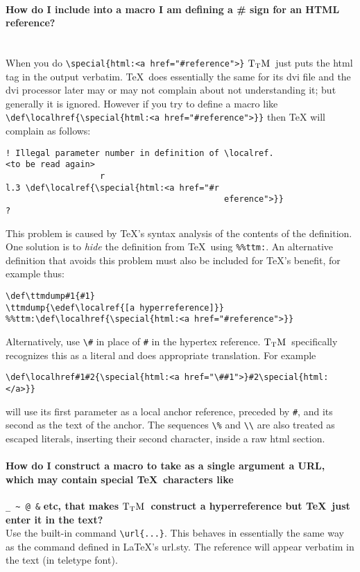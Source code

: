 \documentclass[12pt]{article}
\def\ttmdump{}
\def\TtM{$\rm{}T_TH$}
\def\TtM{$\rm{}T_TM$}%
\begin{document}
\paragraph{How do I include into a macro I am defining a \# sign
for an HTML reference?}\leavevmode\\
When you do \verb!\special{html:<a href="#reference">}! 
\TtM\ just puts the html tag in the output verbatim. \TeX\ does essentially the
same for its dvi file and the dvi processor later may or may not complain
about not understanding it; but generally it is ignored. However if you try
to define a macro like
\verb|\def\localhref{\special{html:<a href="#reference">}}| then \TeX
will complain as follows:\begin{verbatim}
! Illegal parameter number in definition of \localref.
<to be read again> 
                   r
l.3 \def\localref{\special{html:<a href="#r
                                            eference">}}
?\end{verbatim} This problem is caused by \TeX's syntax analysis of
the contents of the definition. One solution is to {\it hide} the
definition from \TeX\ using \verb|%%ttm:|. An alternative definition
that avoids this problem must also be included for \TeX's benefit, for
example thus:\begin{verbatim}
\def\ttmdump#1{#1}
\ttmdump{\edef\localref{[a hyperreference]}}
%%ttm:\def\localhref{\special{html:<a href="#reference">}}
\end{verbatim}
Alternatively, use \verb+\#+ in place of \verb+#+ in the hypertex
reference. \TtM\ specifically recognizes this as a literal and does
appropriate translation. For example
\begin{verbatim}
\def\localhref#1#2{\special{html:<a href="\##1">}#2\special{html:</a>}}
\end{verbatim}
will use its first parameter as a local anchor reference, preceded by \verb|#|,
and its second as the text of the anchor. The sequences \verb!\%! and
\verb!\\! are also treated as escaped literals, inserting their second
character, inside a raw html section.

\paragraph{How do I construct a macro to take as a single
argument a URL, which may contain special \TeX\ characters like} 
\verb|_ ~ @ &| 
\textbf{etc, that makes \TtM\ construct a hyperreference but \TeX\ just enter it in the
text?}\leavevmode\\ Use the built-in command \verb!\url{...}!. This behaves in
essentially the same way as the command defined in \LaTeX's
url.sty. The reference will appear verbatim in the text (in teletype
font).
\end{document}
